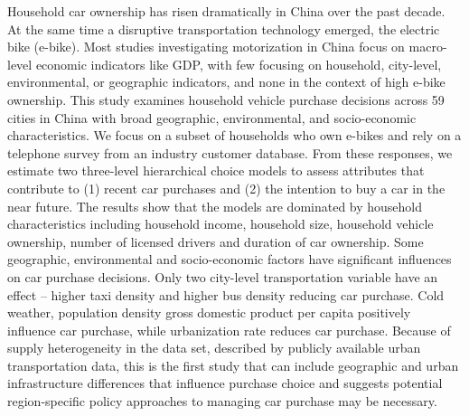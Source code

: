 Household car ownership has risen dramatically in China over the past decade. At the same time a disruptive transportation technology emerged, the electric bike (e-bike). Most studies investigating motorization in China focus on macro-level economic indicators like GDP, with few focusing on household, city-level, environmental, or geographic indicators, and none in the context of high e-bike ownership. This study examines household vehicle purchase decisions across 59 cities in China with broad geographic, environmental, and socio-economic characteristics. We focus on a subset of households who own e-bikes and rely on a telephone survey from an industry customer database. From these responses, we estimate two three-level hierarchical choice models to assess attributes that contribute to (1) recent car purchases and (2) the intention to buy a car in the near future. The results show that the models are dominated by household characteristics including household income, household size, household vehicle ownership, number of licensed drivers and duration of car ownership. Some geographic, environmental and socio-economic factors have significant influences on car purchase decisions. Only two city-level transportation variable have an effect – higher taxi density and higher bus density reducing car purchase. Cold weather, population density gross domestic product per capita positively influence car purchase, while urbanization rate reduces car purchase. Because of supply heterogeneity in the data set, described by publicly available urban transportation data, this is the first study that can include geographic and urban infrastructure differences that influence purchase choice and suggests potential region-specific policy approaches to managing car purchase may be necessary.
